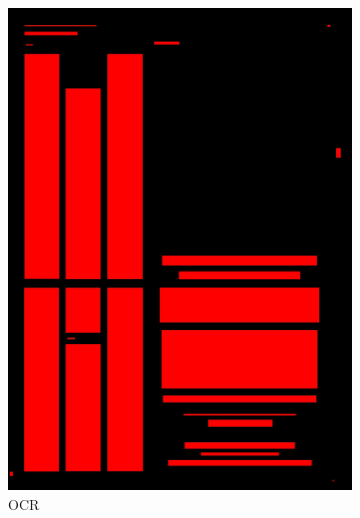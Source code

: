\documentclass[aspectratio=1610]{beamer}
\begin{document}
\begin{frame}
  \begin{figure}
\centering
\begin{subfigure}{.25\textwidth}
  \centering
  \includegraphics[width=0.99\linewidth, clip=true, trim = 0mm 0mm 0mm 0mm]{figures/ocr/9rwJ51v.jpg}
  \caption{OCR}
\end{subfigure}%
\begin{subfigure}{.25\textwidth}
  \centering

\end{subfigure}
\end{figure}
\end{frame}
\end{document}
